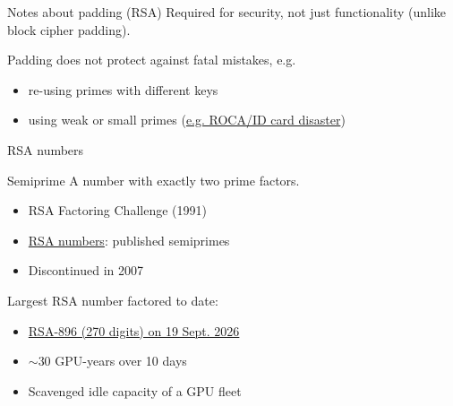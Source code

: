 \begin{frame}{Notes about padding (RSA)}
  Required for security, not just functionality (unlike block cipher padding).

  \vspace*{1em}

  \pause
  Padding does not protect against fatal mistakes, e.g.
  \begin{itemize}[<+(1)->]
    \item re-using primes with different keys
    \item using weak or small primes (\href{https://cybersec.ee/2017/10/18/rsa-2048-bit-keys-in-estonian-id-cards-issued-after-october-2014-are-factorizable/}{e.g. ROCA/ID card disaster})
  \end{itemize}
\end{frame}

\begin{frame}{RSA numbers}
  \pause
  \begin{block}{Semiprime}
    A number with exactly two prime factors.
  \end{block}
  
  \begin{itemize}[<+(1)->]
    \item RSA Factoring Challenge (1991)
    \item \href{https://en.wikipedia.org/wiki/RSA_numbers}{RSA numbers}: published semiprimes
    \item Discontinued in 2007
  \end{itemize}

  \pause
  Largest RSA number factored to date:
  \begin{itemize}[<+(1)->]
    \item \href{https://saweis.net/posts/rsa-896.html}{RSA-896 (270 digits) on 19 Sept. 2026}
    \item $\sim$30 GPU-years over 10 days
    \item Scavenged idle capacity of a GPU fleet
  \end{itemize}
\end{frame}


